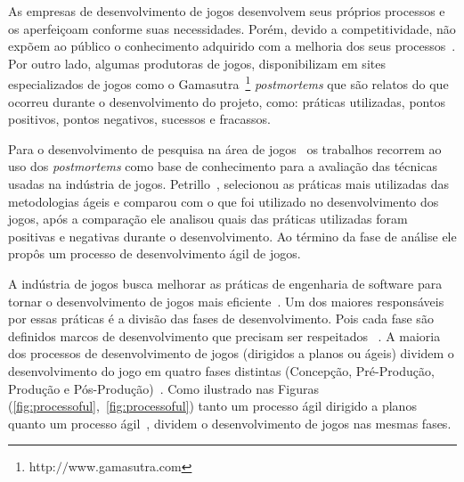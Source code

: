As empresas de desenvolvimento de jogos desenvolvem seus próprios processos e os aperfeiçoam conforme suas necessidades. Porém, devido a competitividade, não expõem ao público o conhecimento adquirido com a melhoria dos seus processos~\cite{origame-2012}. Por outro lado, algumas produtoras de jogos, disponibilizam  em sites especializados de jogos como o Gamasutra~\footnote{http:$//$www.gamasutra.com} \textit{postmortems} que são relatos do que ocorreu durante o desenvolvimento do projeto, como: práticas utilizadas, pontos positivos, pontos negativos, sucessos e fracassos.

Para o desenvolvimento de pesquisa na área de jogos~\cite{petrillo2008,kanode2009} os trabalhos recorrem ao uso dos \textit{postmortems} como base de conhecimento para a avaliação das técnicas usadas na indústria de jogos. Petrillo~\cite{petrillo2008}, selecionou as práticas mais utilizadas das metodologias ágeis e comparou com o que foi utilizado no desenvolvimento dos jogos, após a comparação ele analisou quais das práticas utilizadas foram positivas e negativas durante o desenvolvimento. Ao término da fase de análise ele propôs um processo de desenvolvimento ágil de jogos.


A indústria de jogos busca melhorar as práticas de engenharia de software para tornar o desenvolvimento de jogos mais eficiente~\cite{kanode2009}. Um dos maiores responsáveis por essas práticas é a divisão das fases de desenvolvimento. Pois cada fase são definidos marcos de desenvolvimento que precisam ser respeitados ~\cite{fullerton2008game,keith2010agile}.
A maioria dos processos de desenvolvimento de jogos (dirigidos a planos ou ágeis) dividem o desenvolvimento do jogo em quatro fases distintas (Concepção, Pré-Produção, Produção e Pós-Produção)~\cite{kanode2009,keith2010agile,fullerton2008game,moore2011basics}. Como ilustrado nas Figuras (\ref{fig:processoful},~\ref{fig:processoful}) tanto um processo ágil dirigido a planos~\cite{fullerton2008game} quanto um processo ágil~\cite{keith2010agile}, dividem o desenvolvimento de jogos nas mesmas fases.

